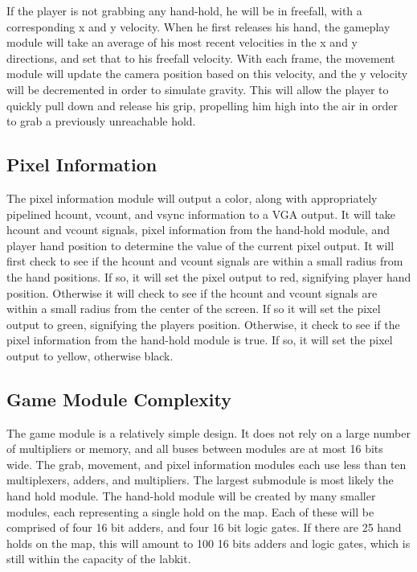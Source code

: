 If the player is not grabbing any hand-hold, he will be in freefall, with a corresponding x and y velocity. When he first releases his hand, the gameplay module will take an average of his most recent velocities in the x and y directions, and set that to his freefall velocity. With each frame, the movement module will update the camera position based on this velocity, and the y velocity will be decremented in order to simulate gravity. This will allow the player to quickly pull down and release his grip, propelling him high into the air in order to grab a previously unreachable hold. 


\subsection{Pixel Information}

The pixel information module will output a color, along with appropriately pipelined hcount, vcount, and vsync information to a VGA output. It will take hcount and vcount signals, pixel information from the hand-hold module, and player hand position to determine the value of the current pixel output. It will first check to see if the hcount and vcount signals are within a small radius from the hand positions. If so, it will set the pixel output to red, signifying player hand position. Otherwise it will check to see if the hcount and vcount signals are within a small radius from the center of the screen. If so it will set the pixel output to green, signifying the players position. Otherwise, it check to see if the pixel information from the hand-hold module is true. If so, it will set the pixel output to yellow, otherwise black.  

\subsection{Game Module Complexity}

The game module is a relatively simple design. It does not rely on a large number of multipliers or memory, and all buses between modules are at most 16 bits wide. The grab, movement, and pixel information modules each use less than ten multiplexers, adders, and multipliers. The largest submodule is most likely the hand hold module. The hand-hold module will be created by many smaller modules, each representing a single hold on the map. Each of these will be comprised of  four 16 bit adders, and four 16 bit logic gates. If there are 25 hand holds on the map, this will amount to 100 16 bits adders and logic gates, which is still within the capacity of the labkit.

